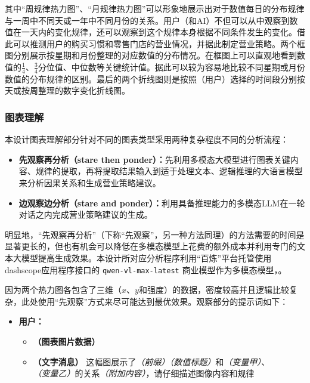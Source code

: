 其中“周规律热力图”、“月规律热力图”可以形象地展示出对于数值每日的分布规律与一周中不同天或一年中不同月份的关系。用户（和AI）不但可以从中观察到数值在一天内的变化规律，还可以观察到这个规律本身根据不同条件发生的变化。借此可以推测用户的购买习惯和零售门店的营业情况，并据此制定营业策略。两个框图分别展示按星期和月份整理的对应数值的分布情况。在框图上可以直观地看到数值的$\frac{1}{4}$、$\frac{3}{4}$分位值、中位数等关键统计值。据此可以较为容易地比较不同星期或月份数值的分布规律的区别。最后的两个折线图则是按照（用户）选择的时间段分别按天或按周整理的数字变化折线图。

\subsubsection{图表理解}

本设计图表理解部分针对不同的图表类型采用两种复杂程度不同的分析流程：

\begin{itemize}
    \item \textbf{先观察再分析（stare then ponder）：}先利用多模态大模型进行图表关键内容、规律的提取，再将提取结果输入到适于处理文本、逻辑推理的大语言模型来分析因果关系和生成营业策略建议。
    \item \textbf{边观察边分析（stare and ponder）：}利用具备推理能力的多模态LLM在一轮对话之内完成营业策略建议的生成。
\end{itemize}

明显地，“先观察再分析”（下称“先观察”，另一种方法同理）的方法需要的时间是显著更长的，但也有机会可以降低在多模态模型上花费的额外成本并利用专门的文本大模型提高生成效果。本设计所对应分析程序利用“百炼”平台托管使用dashscope应用程序接口的 \verb|qwen-vl-max-latest| 商业模型作为多模态模型，。

因为两个热力图各包含了三维（$x$、$y$和强度）的数据，密度较高并且逻辑比较复杂，此处使用“先观察”方式来尽可能达到最优效果。观察部分的提示词如下：

\begin{itemize}
    \item[] \textbf{用户：}
    \begin{itemize}
        \item[] \textbf{（图表图片数据）}
        \item[] \textbf{（文字消息）} 这幅图展示了\textit{（前缀）}\textit{（数值标题）}和\textit{（变量甲）}、\textit{（变量乙）}的关系\textit{（附加内容）}，请仔细描述图像内容和规律
    \end{itemize}
\end{itemize}

